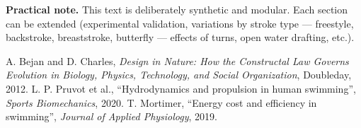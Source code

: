 \documentclass[12pt,a4paper]{article}
\begin{document}
\bigskip
\noindent\textbf{Practical note.} This text is deliberately synthetic and modular. Each section can be extended (experimental validation, variations by stroke type — freestyle, backstroke, breaststroke, butterfly — effects of turns, open water drafting, etc.).

\begin{thebibliography}{9}
 A. Bejan and D. Charles, \emph{Design in Nature: How the Constructal Law Governs Evolution in Biology, Physics, Technology, and Social Organization}, Doubleday, 2012.
 L. P. Pruvot et al., ``Hydrodynamics and propulsion in human swimming'', \emph{Sports Biomechanics}, 2020.
 T. Mortimer, ``Energy cost and efficiency in swimming'', \emph{Journal of Applied Physiology}, 2019.
\end{thebibliography}
\end{document}
